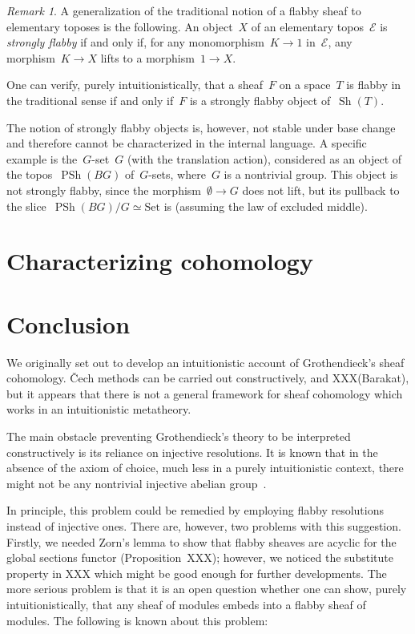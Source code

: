 \documentclass[oneside]{amsart}
\theoremstyle{definition}
\theoremstyle{plain}
\theoremstyle{remark}
\newtheorem{rem}[defn]{Remark}
\newcommand{\E}{\mathcal{E}}
\DeclareMathOperator{\Sh}{Sh}
\DeclareMathOperator{\PSh}{PSh}
\newcommand{\Set}{\mathrm{Set}}
\renewcommand{\_}{\mathpunct{.}\,}
\begin{document}
\begin{rem}A generalization of the traditional notion of a flabby sheaf to
elementary toposes is the following. An object~$X$ of an elementary topos~$\E$
is \emph{strongly flabby} if and only if, for any monomorphism~$K \to 1$
in~$\E$, any morphism~$K \to X$ lifts to a morphism~$1 \to X$.

One can verify, purely intuitionistically, that a sheaf~$F$ on a space~$T$ is
flabby in the traditional sense if and only if~$F$ is a strongly flabby object
of~$\Sh(T)$.

The notion of strongly flabby objects is, however, not stable under base change
and therefore cannot be characterized in the internal language. A specific
example is the~$G$-set~$G$ (with the translation action), considered as an
object of the topos~$\PSh(BG)$ of~$G$-sets, where~$G$ is a nontrivial group.
This object is not strongly flabby, since the morphism~$\emptyset \to G$ does
not lift, but its pullback to the slice~$\PSh(BG)/G \simeq \Set$ is (assuming
the law of excluded middle).
\end{rem}


\section{Characterizing cohomology}



\section{Conclusion}
\label{sect:conclusion}

We originally set out to develop an intuitionistic account of Grothendieck's
sheaf cohomology. Čech methods can be carried out constructively, and
XXX(Barakat), but it appears that there is not a general framework for sheaf
cohomology which works in an intuitionistic metatheory.

The main obstacle preventing Grothendieck's theory to be interpreted
constructively is its reliance on injective resolutions. It is known that in
the absence of the axiom of choice, much less in a purely intuitionistic
context, there might not be any nontrivial injective abelian
group~\cite{blass:inj-proj-axc}.

In principle, this problem could be remedied by employing flabby resolutions
instead of injective ones. There are, however, two problems with this
suggestion. Firstly, we needed Zorn's lemma to show that flabby sheaves are
acyclic for the global sections functor (Proposition~XXX); however, we noticed
the substitute property in XXX which might be good enough for further
developments. The more serious problem is that it is an open question whether
one can show, purely intuitionistically, that any sheaf of modules embeds into
a flabby sheaf of modules. The following is known about this problem:
\end{document}
